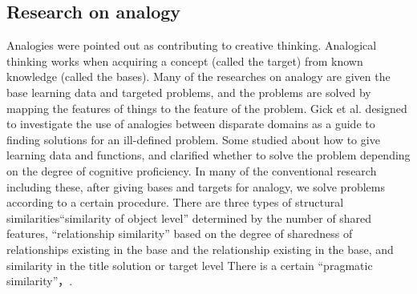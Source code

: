 \documentclass[journal]{IAENGtran}
\begin{document}
\subsection{Research on analogy}
\label{subsec:Research on analogy}

Analogies were pointed out as contributing to creative thinking\cite{Codd04}.
Analogical thinking works when acquiring a concept (called the target) from known knowledge (called the bases)\cite{Codd05}.
Many of the researches on analogy are given the base learning data and targeted problems, and the problems are solved by mapping the features of things to the feature of the problem\cite{Codd06}.
Gick et al. designed to investigate the use of analogies between disparate domains as a guide to finding solutions for an ill-defined problem.
Some studied about how to give learning data and functions\cite{Codd07}, and clarified whether to solve the problem depending on the degree of cognitive proficiency\cite{Codd08}.
In many of the conventional research including these, after giving bases and targets for analogy, we solve problems according to a certain procedure.
There are three types of structural similarities``similarity of object level'' determined by the number of shared features, ``relationship similarity'' based on the degree of sharedness of relationships existing in the base and the relationship existing in the base, and similarity in the title solution or target level There is a certain ``pragmatic similarity''\cite{Codd05}，\cite{Codd09}.
\end{document}
